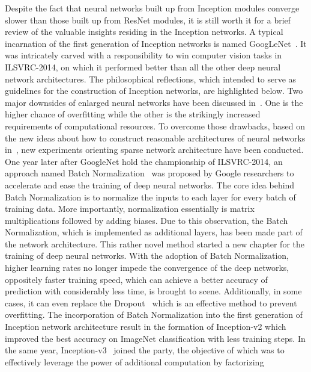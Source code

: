 Despite the fact that neural networks built up from Inception modules
converge slower than those built up from ResNet modules, it is still
worth it for a brief review of the valuable insights residing in
the Inception networks.
A typical incarnation of the first generation of Inception networks is named
GoogLeNet~\parencite{RN60}.
It was intricately carved with a responsibility to win computer vision
tasks in ILSVRC-2014, on which it performed better than all the other
deep neural network architectures.
The philosophical reflections, which intended to serve as guidelines
for the construction of Inception networks, are highlighted below.
Two major downsides of enlarged neural networks have been discussed
in~\parencite{RN60}.
One is the higher chance of overfitting while the other is
the strikingly increased requirements of computational resources.
To overcome those drawbacks, based on the new ideas 
about how to construct reasonable architectures of
neural networks in~\parencite{RN207}, new experiments orienting 
sparse network architecture have been conducted.
One year later after GoogleNet hold the championship of ILSVRC-2014,
an approach named Batch Normalization~\parencite{RN61} was
proposed by Google researchers to accelerate and ease the
training of deep neural networks.
The core idea behind Batch Normalization is to normalize
the inputs to each layer for every batch of training data.
More importantly, normalization
essentially is matrix multiplications followed by adding biases.
Due to this observation, the Batch Normalization, which is implemented 
as additional layers, has been made part of
the network architecture.
This rather novel method started a new chapter for the training of deep
neural networks.
With the adoption of Batch Normalization, higher learning rates no longer
impede the convergence of the deep networks, oppositely faster
training speed, which can achieve a
better accuracy of prediction with considerably less time, is brought to scene.
Additionally, in some cases, it can even replace the Dropout~\parencite{RN70}
which is an effective method to prevent overfitting.
The incorporation of Batch Normalization into the first generation of
Inception network architecture result in the formation of Inception-v2 which
improved the best accuracy on ImageNet classification with less training steps.
In the same year, Inception-v3~\parencite{RN62} joined the party, 
the objective of which was
to effectively leverage the power of additional computation by factorizing
